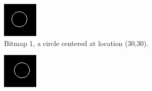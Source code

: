 \documentclass[12pt]{article}
\begin{document}
\begin{figure}[ht]
\centering
\begin{subfigure}[b]{.3\linewidth}
\includegraphics[width=\linewidth]{circle-left.png}
\caption{Bitmap 1, a circle centered at location (30,30).}
\label{fig:circle-left}
\end{subfigure}
\hspace{2mm}
\begin{subfigure}[b]{.3\linewidth}
\includegraphics[width=\linewidth]{circle-right.png}

\end{subfigure}
\end{figure}
\end{document}
